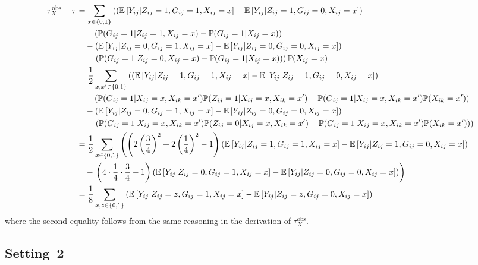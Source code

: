 \documentclass[10pt]{article}
\begin{document}
\begin{align*}
\tau_{X}^\text{obs} - \tau &= \sum_{x\in\{0,1\}} \left(\left(\mathbb{E}\left[Y_{ij}|Z_{ij}=1,G_{ij}=1,X_{ij}=x\right] - \mathbb{E}\left[Y_{ij}|Z_{ij}=1,G_{ij}=0,X_{ij}=x\right]\right)\right. \\
&\qquad \left(\mathbb{P}(G_{ij}=1|Z_{ij}=1,X_{ij}=x)-\mathbb{P}(G_{ij}=1|X_{ij}=x)\right) \\
&\quad - \left(\mathbb{E}\left[Y_{ij}|Z_{ij}=0,G_{ij}=1,X_{ij}=x\right] - \mathbb{E}\left[Y_{ij}|Z_{ij}=0,G_{ij}=0,X_{ij}=x\right]\right) \\
&\qquad \left.\left(\mathbb{P}(G_{ij}=1|Z_{ij}=0,X_{ij}=x)-\mathbb{P}(G_{ij}=1|X_{ij}=x)\right)\right)\mathbb{P}(X_{ij}=x) \\
&= \frac{1}{2}\sum_{x,x'\in\{0,1\}} \left(\left(\mathbb{E}\left[Y_{ij}|Z_{ij}=1,G_{ij}=1,X_{ij}=x\right] - \mathbb{E}\left[Y_{ij}|Z_{ij}=1,G_{ij}=0,X_{ij}=x\right]\right)\right. \\
&\qquad \left(\mathbb{P}(G_{ij}=1|X_{ij}=x,X_{ik}=x')\mathbb{P}(Z_{ij}=1|X_{ij}=x,X_{ik}=x')-\mathbb{P}(G_{ij}=1|X_{ij}=x,X_{ik}=x')\mathbb{P}(X_{ik}=x')\right) \\
&\quad - \left(\mathbb{E}\left[Y_{ij}|Z_{ij}=0,G_{ij}=1,X_{ij}=x\right] - \mathbb{E}\left[Y_{ij}|Z_{ij}=0,G_{ij}=0,X_{ij}=x\right]\right) \\
&\qquad \left.\left(\mathbb{P}(G_{ij}=1|X_{ij}=x,X_{ik}=x')\mathbb{P}(Z_{ij}=0|X_{ij}=x,X_{ik}=x')-\mathbb{P}(G_{ij}=1|X_{ij}=x,X_{ik}=x')\mathbb{P}(X_{ik}=x')\right)\right) \\
&= \frac{1}{2}\sum_{x\in\{0,1\}}\left(\left(2\left(\frac{3}{4}\right)^2+2\left(\frac{1}{4}\right)^2 - 1\right)\left(\mathbb{E}\left[Y_{ij}|Z_{ij}=1,G_{ij}=1,X_{ij}=x\right] - \mathbb{E}\left[Y_{ij}|Z_{ij}=1,G_{ij}=0,X_{ij}=x\right]\right)\right. \\
&\quad - \left.\left(4\cdot\frac{1}{4}\cdot\frac{3}{4} - 1\right)\left(\mathbb{E}\left[Y_{ij}|Z_{ij}=0,G_{ij}=1,X_{ij}=x\right] - \mathbb{E}\left[Y_{ij}|Z_{ij}=0,G_{ij}=0,X_{ij}=x\right]\right)\right) \\
&= \frac{1}{8}\sum_{x,z\in\{0,1\}}\left(\mathbb{E}\left[Y_{ij}|Z_{ij}=z,G_{ij}=1,X_{ij}=x\right] - \mathbb{E}\left[Y_{ij}|Z_{ij}=z,G_{ij}=0,X_{ij}=x\right]\right)
\end{align*}
where the second equality follows from the same reasoning in the derivation of $\tau_X^\text{obs}$.
\fi


\subsection{Setting~2}\label{apx:setting2}
\end{document}
